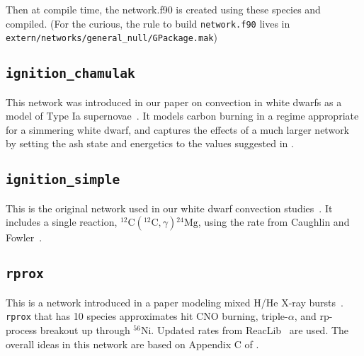 Then at compile time, the network.f90 is created using these species and
compiled.  (For the curious, the rule to build {\tt network.f90} lives in
{\tt extern/networks/general\_null/GPackage.mak})


\subsection{{\tt ignition\_chamulak}}

This network was introduced in our paper on convection in white dwarfs
as a model of Type Ia supernovae~\cite{wdconvect}.  It models 
carbon burning in a regime appropriate for a simmering white dwarf,
and captures the effects of a much larger network by setting the ash
state and energetics to the values suggested in \cite{chamulak:2008}.

\subsection{{\tt ignition\_simple}}

This is the original network used in our white dwarf convection
studies~\cite{lowMach4}.  It includes a single reaction,
$^{12}\mathrm{C}({}^{12}\mathrm{C},\gamma){}^{24}\mathrm{Mg}$, using
the rate from Caughlin and Fowler~\cite{caughlan-fowler:1988}.

\subsection{{\tt rprox}}

This is a network introduced in a paper modeling mixed H/He X-ray
bursts~\cite{xrb2}.  {\tt rprox} that has 10 species approximates hit
CNO burning, triple-$\alpha$, and rp-process breakout up through
$^{56}\mathrm{Ni}$.  Updated rates from ReacLib~\cite{ReacLib} are
used.  The overall ideas in this network are based on Appendix C of
\cite{wallacewoosley:1981}.
